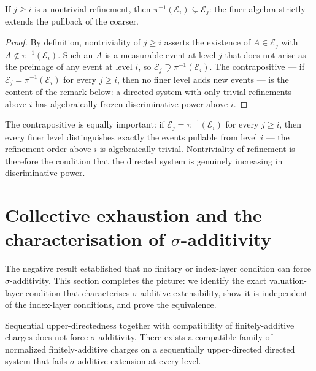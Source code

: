 \begin{proposition}
\label{prop:nontrivial}
If $j \geq i$ is a nontrivial refinement, then $\pi^{-1}(\mathcal{E}_i)
\subsetneq \mathcal{E}_j$: the finer algebra strictly extends the pullback of the
coarser.
\end{proposition}

\begin{proof}
By definition, nontriviality of $j \geq i$ asserts the existence of
$A \in \mathcal{E}_j$ with $A \notin \pi^{-1}(\mathcal{E}_i)$.  Such an $A$ is
a measurable event at level $j$ that does not arise as the preimage of any event
at level $i$, so $\mathcal{E}_j \supsetneq \pi^{-1}(\mathcal{E}_i)$.
The contrapositive --- if $\mathcal{E}_j = \pi^{-1}(\mathcal{E}_i)$ for every
$j \geq i$, then no finer level adds new events --- is the content of the
remark below: a directed system with only trivial refinements above $i$ has
algebraically frozen discriminative power above $i$.
\end{proof}

\begin{remark}
The contrapositive is equally important: if $\mathcal{E}_j = \pi^{-1}(\mathcal{E}_i)$
for every $j \geq i$, then every finer level distinguishes exactly the events
pullable from level $i$ --- the refinement order above $i$ is algebraically trivial.
Nontriviality of refinement is therefore the condition that the directed system is
genuinely increasing in discriminative power.
\end{remark}


\section{Collective exhaustion and the characterisation of $\sigma$-additivity}
\label{sec:positive}

The negative result established that no finitary or index-layer condition can force
$\sigma$-additivity.  This section completes the picture: we identify the exact
valuation-layer condition that characterises $\sigma$-additive extensibility, show it
is independent of the index-layer conditions, and prove the equivalence.

\begin{proposition}
\label{prop:independence}
Sequential upper-directedness together with compatibility of finitely-additive charges
does not force $\sigma$-additivity.  There exists a compatible family of normalized
finitely-additive charges on a sequentially upper-directed directed system that fails
$\sigma$-additive extension at every level.
\end{proposition}

